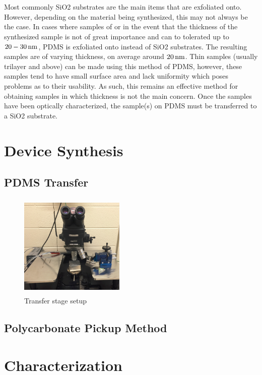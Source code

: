\\ \\
\noindent Most commonly \acs{SiO2} substrates are the main items that are exfoliated onto. However, depending on the material being synthesized, this may not always be the case. In cases where samples of \hbn or in the event that the thickness of the synthesized sample is not of great importance and can to tolerated up to $20-30\,\mathrm{nm}$, \ac{PDMS} is exfoliated onto instead of \acs{SiO2} substrates. The resulting samples are of varying thickness, on average around $20\,\mathrm{nm}$. Thin samples (usually trilayer and above) can be made using this method of \acs{PDMS}, however, these samples tend to have small surface area and lack uniformity which poses problems as to their usability. As such, this remains an effective method for obtaining samples in which thickness is not the main concern. Once the samples have been optically characterized, the sample(s) on \acs{PDMS} must be transferred to a \acs{SiO2} substrate.

\section{Device Synthesis}\label{sec:synthesis}
\subsection{\acs{PDMS} Transfer}\label{subsec:pdms_transfer}
\begin{figure}[ht]
	\centering
	\includegraphics[height=5cm,width=5cm]{figs/experimental/transfer_stage_setup}
	\caption[Transfer stage setup]{Transfer stage setup}
	\label{fig:transfer_stage_setup}
\end{figure}
\subsection{Polycarbonate Pickup Method}\label{subsec:pc_pickup}

\section{Characterization}\label{sec:characterization}

